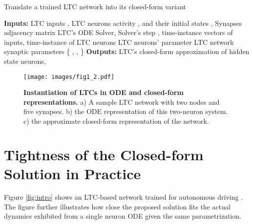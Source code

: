 \documentclass[12pt]{article}
\begin{document}
\begin{algorithm}[t]
\caption{Translate a trained LTC network into its closed-form variant}
\label{alg:compiler}
\begin{algorithmic}
\STATE \textbf{Inputs:} LTC inputs , LTC neurons activity , and their initial states , Synapses adjacency matrix  
\STATE LTC's ODE Solver, Solver's step , 
\STATE time-instance vectors of inputs,  
\STATE time-instance of LTC neurons  
    \STATE LTC neurons' parameter 
    \STATE LTC network synaptic parameters \{ , , \}
    \STATE \textbf{Outputs:} LTC's closed-form approximation of hidden state neurons, 
\STATE  
{}
        \STATE  
    \ENDFOR
\ENDFOR
    \RETURN 
\end{algorithmic}
\end{algorithm}

\begin{figure}[t]
	\centering
	\texttt{[image: images/fig1\_2.pdf]}
	\caption{\textbf{Instantiation of LTCs in ODE and closed-form representations.} a) A sample LTC network with two nodes and five synapses. b) the ODE representation of this two-neuron system. c) the approximate closed-form representation of the network.}
	\label{fig:sample}
\end{figure}



\section*{Tightness of the Closed-form Solution in Practice}
Figure \ref{fig:intro} shows an LTC-based network trained for autonomous driving \cite{lechner2020neural}. The figure further illustrates how close the proposed solution fits the actual dynamics exhibited from a single neuron ODE given the same parametrization. 
\end{document}
